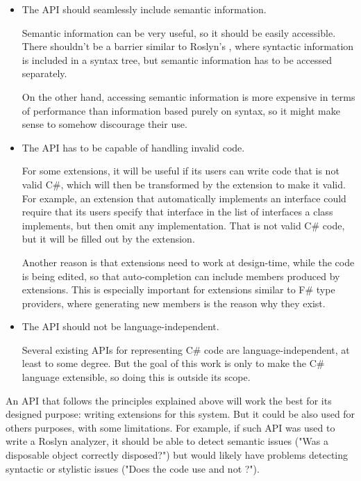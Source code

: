\begin{itemize}
\item The \ac{API} should seamlessly include semantic information.

Semantic information can be very useful, so it should be easily accessible. There shouldn't be a barrier similar to Roslyn's , where syntactic information is included in a syntax tree, but semantic information has to be accessed separately.

On the other hand, accessing semantic information is more expensive in terms of performance than information based purely on syntax, so it might make sense to somehow discourage their use.

\item The \ac{API} has to be capable of handling invalid code.

For some extensions, it will be useful if its users can write code that is not valid C\#, which will then be transformed by the extension to make it valid. For example, an extension that automatically implements an interface could require that its users specify that interface in the list of interfaces a class implements, but then omit any implementation. That is not valid C\# code, but it will be filled out by the extension.

Another reason is that extensions need to work at design-time, while the code is being edited, so that auto-completion can include members produced by extensions. This is especially important for extensions similar to F\# type providers, where generating new members is the reason why they exist.

\item The \ac{API} should not be language-independent.

\nopagebreak

Several existing \acp{API} for representing C\# code are language-independent, at least to some degree. But the goal of this work is only to make the C\# language extensible, so doing this is outside its scope.

\end{itemize}

An \ac{API} that follows the principles explained above will work the best for its designed purpose: writing extensions for this system. But it could be also used for others purposes, with some limitations. For example, if such \ac{API} was used to write a Roslyn analyzer, it should be able to detect semantic issues ("Was a disposable object correctly disposed?") but would likely have problems detecting syntactic or stylistic issues ("Does the code use  and not ?").

